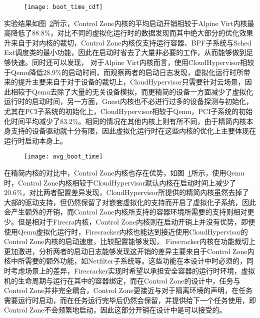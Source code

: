 \begin{figure}[!htbp]
    \centering
    \texttt{[image: boot\_time\_cdf]}
    \label{fig:boot_time_cdf}
\end{figure}

实验结果如图~\ref{fig:avg_boot_time}所示，Control Zone内核的平均启动开销相较于Alpine Virt内核最高降低了88.8\%，对比不同的虚拟化运行时的数据发现而其中绝大部分的优化效果升来自于对内核的裁切，Control Zone内核仅支持运行容器、BPF子系统与Sched Ext调度类的最小功能，因此在启动时省去了大量非必要的工作，从而能够做到足够快速。同时还可以发现， 对于Alpine Virt内核而言，使用CloudHypervisor相较于Qemu降低28.9\%的启动时间，而观察两者的启动日志发现，虚拟化运行时所带来的提升主要来自于对于设备的裁切上，CloudHypervisor只需要针对云场景，因此相较于Qemu去除了大量的无关设备模拟，而更精简的设备一方面减少了虚拟化运行时的启动时间，另一方面，Guest内核也不必进行过多的设备探测与初始化，尤其在PCI子系统的初始化上，CloudHypervisor相较于Qemu，PCI子系统的初始化时间平均减少了83.2\%。相同的情况在其他内核上则有所不同，由于精简内核本身支持的设备驱动就十分有限，因此虚拟化运行时在这些内核的优化上主要体现在运行时启动本身上。

\begin{figure}[!htbp]
    \centering
    \texttt{[image: avg\_boot\_time]}
    \label{fig:avg_boot_time}
\end{figure}

在精简内核的对比中，Control Zone内核也存在优势，如图~\ref{fig:boot_time_cdf}所示，使用Qemu时，Control Zone内核相较于CloudHypervisor默认内核在启动时间上减少了20.6\%，对比两者配置差异发现，CloudHypervisor所提供的精简内核虽然去掉了大部的驱动支持，但仍然保留了对嵌套虚拟化的支持而开启了虚拟化子系统，因此会产生额外的开销，而Control Zone内核所支持的容器环境所需要的支持则相对更少。但是相对于Firecra内核，Control Zone内核则在启动开销上并没有优势，即便使用Qemu虚拟化运行时，Firecracker内核也能达到接近使用CloudHypervisor的Control Zone内核的启动速度，比较配置能够发现， Firecracker内核在功能裁切上更加激进，分析两者的启动日志能够发现这开销的差异主要来自于Control Zone内核中所需要的额外功能，如Netfilter子系统等。这些功能在本设计中时必须的，同时考虑场景上的差异，Firecracker实现时希望以承担安全容器的运行时环境，虚拟机的生命周期与运行在其中的容器绑定，而在Control Zone的设计中，任务与Control Zone并非完全耦合，Control Zone更接近与对于隔离环境的声明，在任务需要运行时启动，而在任务运行完毕后仍然会保留，并提供给下一个任务使用，即Control Zone不会频繁地启动，因此这部分开销在设计中是可以接受的。

